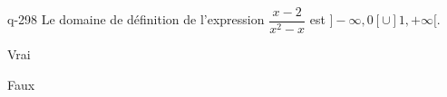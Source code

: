 \begin{truefalse}{q-298}
Le domaine de définition de l'expression $\dfrac{x-2}{x^2-x}$ est $]-\infty,0[\cup ]1,+\infty[$.
\item Vrai
\item* Faux
\end{truefalse}

